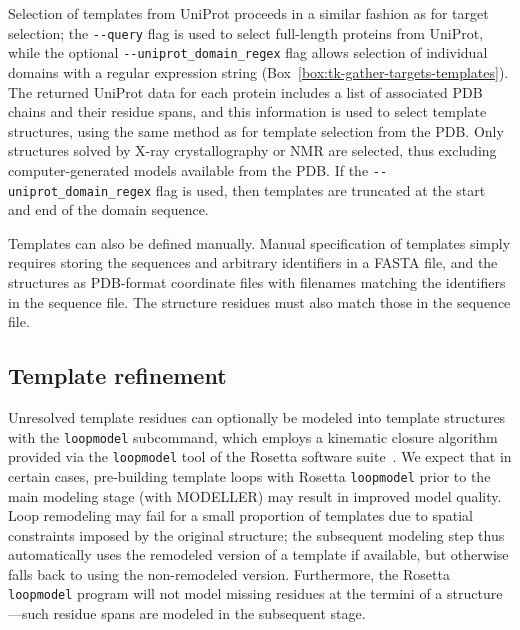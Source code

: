 \documentclass[aps,pre,twocolumn,nofootinbib,superscriptaddress,linenumbers]{revtex4-1}
\begin{document}
Selection of templates from UniProt proceeds in a similar fashion as for target selection; the {\tt -{}-query} flag is used to select full-length proteins from UniProt, while the optional {\tt -{}-uniprot\_domain\_regex} flag allows selection of individual domains with a regular expression string (Box~\ref{box:tk-gather-targets-templates}).
The returned UniProt data for each protein includes a list of associated PDB chains and their residue spans, and this information is used to select template structures, using the same method as for template selection from the PDB.
Only structures solved by X-ray crystallography or NMR are selected, thus excluding computer-generated models available from the PDB.
If the {\tt -{}-uniprot\_domain\_regex} flag is used, then templates are truncated at the start and end of the domain sequence.

Templates can also be defined manually.
Manual specification of templates simply requires storing the sequences and arbitrary identifiers in a FASTA file, and the structures as PDB-format coordinate files with filenames matching the identifiers in the sequence file.
The structure residues must also match those in the sequence file.

\subsection{Template refinement}

Unresolved template residues can optionally be modeled into template structures with the {\tt loopmodel} subcommand, which employs a kinematic closure algorithm provided via the {\tt loopmodel} tool of the Rosetta software suite~\cite{qian:nature:2007:modeller,wang:jmb:2007:modeller}.
We expect that in certain cases, pre-building template loops with Rosetta {\tt loopmodel} prior to the main modeling stage (with MODELLER) may result in improved model quality.
Loop remodeling may fail for a small proportion of templates due to spatial constraints imposed by the original structure; the subsequent modeling step thus automatically uses the remodeled version of a template if available, but otherwise falls back to using the non-remodeled version.
Furthermore, the Rosetta {\tt loopmodel} program will not model missing residues at the termini of a structure---such residue spans are modeled in the subsequent stage.
\end{document}
